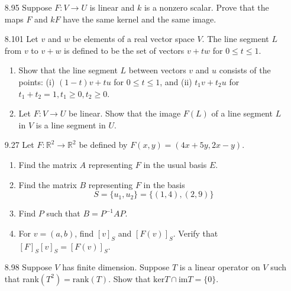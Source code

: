 \documentclass[12pt]{article}
\theoremstyle{definition}
\theoremstyle{plain}
\begin{document}
\begin{enumerate}
\item[8.95] Suppose $F:V\rightarrow U$ is linear and $k$ is a nonzero scalar. Prove that the maps $F$ and $kF$ have the same kernel and the same image.

\item[8.101] Let $v$ and $w$ be elements of a real vector space $V$. The line segment $L$ from $v$ to $v+w$ is defined to be the set of vectors $v+tw$ for $0\leq t \leq 1$.
	\begin{enumerate}
	\item Show that the line segment $L$ between vectors $v$ and $u$ consists of the points: (i) $(1-t)v+tu$ for $0 \leq t \leq 1$, and (ii) $t_1v+t_2u$ for $t_1+t_2=1, t_1\geq 0, t_2\geq 0$.
	\item Let $F:V\rightarrow U$ be linear. Show that the image $F(L)$ of a line segment $L$ in $V$ is a line segment in $U$.
	\end{enumerate}

\item[9.27] Let $F:\mathbb{R}^2\rightarrow\mathbb{R}^2$ be defined by $F(x,y)=(4x+5y,2x-y)$.
	\begin{enumerate}
	\item Find the matrix $A$ representing $F$ in the usual basis $E$.
	\item Find the matrix $B$ representing $F$ in the basis
		\[ S=\{u_1,u_2\}=\{(1,4),(2,9)\} \]
	\item Find $P$ such that $B=P^{-1}AP$.
	\item For $v=(a,b)$, find $[v]_S$ and $[F(v)]_S$. Verify that $[F]_S[v]_S=[F(v)]_S$.
	\end{enumerate}
	
\item[8.98] Suppose $V$ has finite dimension. Suppose $T$ is a linear operator on $V$ such that rank$(T^2)=\mathrm{rank}(T)$. Show that $\mathrm{ker}T \cap \mathrm{im}T = \{0\}$.
	
	
	
	
	
	
	
	
	
	
\end{enumerate}
\end{document}
